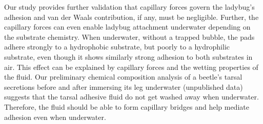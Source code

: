 \documentclass[vruler,JEB]{COB}%
\begin{document}
Our study provides further validation that capillary forces govern the ladybug's adhesion and van der Waals contribution,
if any, must be negligible. Further, the capillary forces can even
enable ladybug attachment underwater depending on the substrate chemistry.
When underwater, without a trapped bubble, the pads adhere strongly
to a hydrophobic substrate, but poorly to a hydrophilic substrate,
even though it shows similarly strong adhesion to both substrates
in air. This effect can be explained by capillary forces and the wetting properties of the fluid. Our
preliminary chemical composition analysis of a beetle's tarsal secretions before and after immersing its leg underwater (unpublished data) suggests that the tarsal adhesive fluid do not get washed away when underwater. Therefore, the fluid should be able to form capillary bridges and help mediate adhesion even when underwater.
\end{document}

